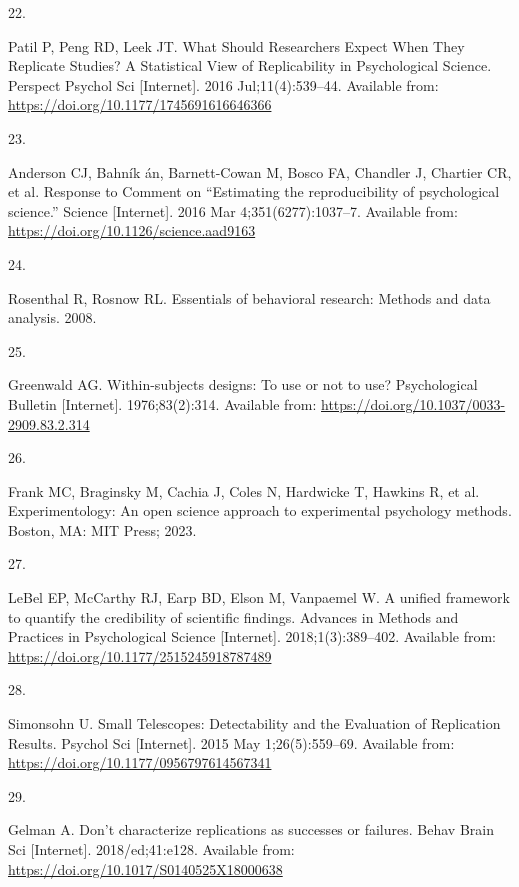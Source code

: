 \documentclass[
  english,
  a4paper,
]{article}
\newlength{\cslhangindent}
\newlength{\csllabelwidth}
\newlength{\cslentryspacingunit} %
\newenvironment{CSLReferences}[2] %
 {%
  \setlength{\parindent}{0pt}
  \ifodd #1
  \let\oldpar\par
  \def\par{\hangindent=\cslhangindent\oldpar}
  \fi
  \setlength{\parskip}{#2\cslentryspacingunit}
 }%
 {}
\newcommand{\CSLLeftMargin}[1]{\parbox[t]{\csllabelwidth}{#1}}
\newcommand{\CSLRightInline}[1]{\parbox[t]{\linewidth - \csllabelwidth}{#1}\break}
\begin{document}
\begin{CSLReferences}{0}{0}
\leavevmode{}%
\CSLLeftMargin{22. }%
\CSLRightInline{Patil P, Peng RD, Leek JT. What {Should Researchers Expect When They Replicate Studies}? {A Statistical View} of {Replicability} in {Psychological Science}. Perspect Psychol Sci {[}Internet{]}. 2016 Jul;11(4):539--44. Available from: \url{https://doi.org/10.1177/1745691616646366}}

\leavevmode{}%
\CSLLeftMargin{23. }%
\CSLRightInline{Anderson CJ, Bahník án, Barnett-Cowan M, Bosco FA, Chandler J, Chartier CR, et al. Response to {Comment} on {``{Estimating} the reproducibility of psychological science.''} Science {[}Internet{]}. 2016 Mar 4;351(6277):1037--7. Available from: \url{https://doi.org/10.1126/science.aad9163}}

\leavevmode{}%
\CSLLeftMargin{24. }%
\CSLRightInline{Rosenthal R, Rosnow RL. Essentials of behavioral research: Methods and data analysis. 2008. }

\leavevmode{}%
\CSLLeftMargin{25. }%
\CSLRightInline{Greenwald AG. Within-subjects designs: To use or not to use? Psychological Bulletin {[}Internet{]}. 1976;83(2):314. Available from: \url{https://doi.org/10.1037/0033-2909.83.2.314}}

\leavevmode{}%
\CSLLeftMargin{26. }%
\CSLRightInline{Frank MC, Braginsky M, Cachia J, Coles N, Hardwicke T, Hawkins R, et al. Experimentology: An open science approach to experimental psychology methods. Boston, MA: MIT Press; 2023. }

\leavevmode{}%
\CSLLeftMargin{27. }%
\CSLRightInline{LeBel EP, McCarthy RJ, Earp BD, Elson M, Vanpaemel W. A unified framework to quantify the credibility of scientific findings. Advances in Methods and Practices in Psychological Science {[}Internet{]}. 2018;1(3):389--402. Available from: \url{https://doi.org/10.1177/2515245918787489}}

\leavevmode{}%
\CSLLeftMargin{28. }%
\CSLRightInline{Simonsohn U. Small {Telescopes}: {Detectability} and the {Evaluation} of {Replication Results}. Psychol Sci {[}Internet{]}. 2015 May 1;26(5):559--69. Available from: \url{https://doi.org/10.1177/0956797614567341}}

\leavevmode{}%
\CSLLeftMargin{29. }%
\CSLRightInline{Gelman A. Don't characterize replications as successes or failures. Behav Brain Sci {[}Internet{]}. 2018/ed;41:e128. Available from: \url{https://doi.org/10.1017/S0140525X18000638}}


\end{CSLReferences}
\end{document}
